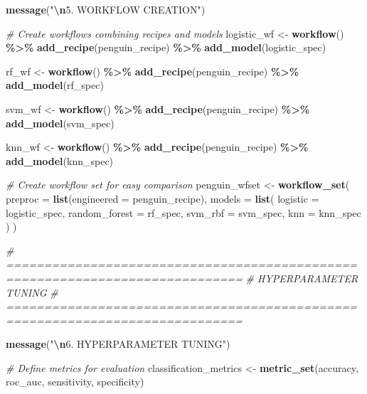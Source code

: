 \documentclass[
]{article}
\newenvironment{Shaded}{\begin{snugshade}}{\end{snugshade}}
\newcommand{\AttributeTok}[1]{\textcolor[rgb]{0.13,0.29,0.53}{#1}}
\newcommand{\CommentTok}[1]{\textcolor[rgb]{0.56,0.35,0.01}{\textit{#1}}}
\newcommand{\FunctionTok}[1]{\textcolor[rgb]{0.13,0.29,0.53}{\textbf{#1}}}
\newcommand{\NormalTok}[1]{#1}
\newcommand{\OtherTok}[1]{\textcolor[rgb]{0.56,0.35,0.01}{#1}}
\newcommand{\SpecialCharTok}[1]{\textcolor[rgb]{0.81,0.36,0.00}{\textbf{#1}}}
\newcommand{\StringTok}[1]{\textcolor[rgb]{0.31,0.60,0.02}{#1}}
\begin{document}
\begin{Shaded}
\begin{Highlighting}[]
\FunctionTok{message}\NormalTok{(}\StringTok{"}\SpecialCharTok{\textbackslash{}n}\StringTok{5. WORKFLOW CREATION"}\NormalTok{)}

\CommentTok{\# Create workflows combining recipes and models}
\NormalTok{logistic\_wf }\OtherTok{\textless{}{-}} \FunctionTok{workflow}\NormalTok{() }\SpecialCharTok{\%\textgreater{}\%}
  \FunctionTok{add\_recipe}\NormalTok{(penguin\_recipe) }\SpecialCharTok{\%\textgreater{}\%}
  \FunctionTok{add\_model}\NormalTok{(logistic\_spec)}

\NormalTok{rf\_wf }\OtherTok{\textless{}{-}} \FunctionTok{workflow}\NormalTok{() }\SpecialCharTok{\%\textgreater{}\%}
  \FunctionTok{add\_recipe}\NormalTok{(penguin\_recipe) }\SpecialCharTok{\%\textgreater{}\%}
  \FunctionTok{add\_model}\NormalTok{(rf\_spec)}

\NormalTok{svm\_wf }\OtherTok{\textless{}{-}} \FunctionTok{workflow}\NormalTok{() }\SpecialCharTok{\%\textgreater{}\%}
  \FunctionTok{add\_recipe}\NormalTok{(penguin\_recipe) }\SpecialCharTok{\%\textgreater{}\%}
  \FunctionTok{add\_model}\NormalTok{(svm\_spec)}

\NormalTok{knn\_wf }\OtherTok{\textless{}{-}} \FunctionTok{workflow}\NormalTok{() }\SpecialCharTok{\%\textgreater{}\%}
  \FunctionTok{add\_recipe}\NormalTok{(penguin\_recipe) }\SpecialCharTok{\%\textgreater{}\%}
  \FunctionTok{add\_model}\NormalTok{(knn\_spec)}

\CommentTok{\# Create workflow set for easy comparison}
\NormalTok{penguin\_wfset }\OtherTok{\textless{}{-}} \FunctionTok{workflow\_set}\NormalTok{(}
  \AttributeTok{preproc =} \FunctionTok{list}\NormalTok{(}\AttributeTok{engineered =}\NormalTok{ penguin\_recipe),}
  \AttributeTok{models =} \FunctionTok{list}\NormalTok{(}
    \AttributeTok{logistic =}\NormalTok{ logistic\_spec,}
    \AttributeTok{random\_forest =}\NormalTok{ rf\_spec,}
    \AttributeTok{svm\_rbf =}\NormalTok{ svm\_spec,}
    \AttributeTok{knn =}\NormalTok{ knn\_spec}
\NormalTok{  )}
\NormalTok{)}

\CommentTok{\# =============================================================================}
\CommentTok{\# HYPERPARAMETER TUNING}
\CommentTok{\# =============================================================================}

\FunctionTok{message}\NormalTok{(}\StringTok{"}\SpecialCharTok{\textbackslash{}n}\StringTok{6. HYPERPARAMETER TUNING"}\NormalTok{)}

\CommentTok{\# Define metrics for evaluation}
\NormalTok{classification\_metrics }\OtherTok{\textless{}{-}} \FunctionTok{metric\_set}\NormalTok{(accuracy, roc\_auc, sensitivity, specificity)}


\end{Highlighting}
\end{Shaded}
\end{document}
